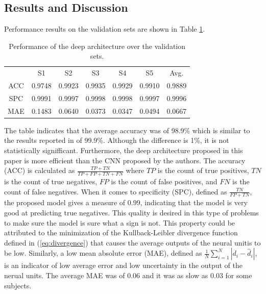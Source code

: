 \documentclass[a4paper]{article}
\begin{document}
\subsection{Results and Discussion}
Performance results on the validation sets are shown in Table
\ref{tbl:performance}. 
\begin{table}
\centering
\caption{Performance of the deep architecture over the validation sets.}
\begin{tabular}{ccccccc}
\hline\noalign{\smallskip}
 & S1 & S2 & S3 & S4 & S5 & Avg. \\ \noalign{\smallskip}
\hline
\noalign{\smallskip}
ACC & 0.9748 & 0.9923 & 0.9935 & 0.9929 & 0.9910 & 0.9889 \\ 
SPC & 0.9991 & 0.9997 & 0.9998 & 0.9998 & 0.9997 & 0.9996 \\
MAE & 0.1483 & 0.0640 & 0.0373 & 0.0347 & 0.0494 & 0.0667\\ \hline
\end{tabular}
\label{tbl:performance}
\end{table}
The table indicates that the average accuracy was of 98.9\% which is similar
to the results reported in \cite{kang2015real} of 99.9\%. Although the
difference is 1\%, it is not
statistically signifficant. Furthermore, the deep architecture proposed in this
paper is more efficient than the CNN proposed by the authors. The accuracy
(ACC) is calculated as $\frac{TP+TN}{TP+FP+TN+FN}$ where $TP$ is the count of
true positives, $TN$ is the count of true negatives, $FP$ is the count of false
positives, and $FN$ is the count of false negatives.
When it comes to specificity (SPC), defined as $\frac{TN}{FP+TN}$, the proposed
model gives a measure of $0.99$, indicating that the model is very good at
predicting true negatives. This quality is desired in this type of problems to
make sure the model is sure what a sign is not. This property could be
attributed to the minimization of the Kullback-Leibler divergence function
defined in (\ref{eq:divergence}) that causes the average outputs of the neural
unitis to be low. Similarly, a low mean absolute error (MAE), defined as
$\frac{1}{N} \sum_{i=1}^N |d_i - \hat{d}_i|$, is an indicator of low average
error and low uncertainty in the output of the nerual units. The average MAE
was of $0.06$ and it was as slow as $0.03$ for some subjects.
\end{document}
